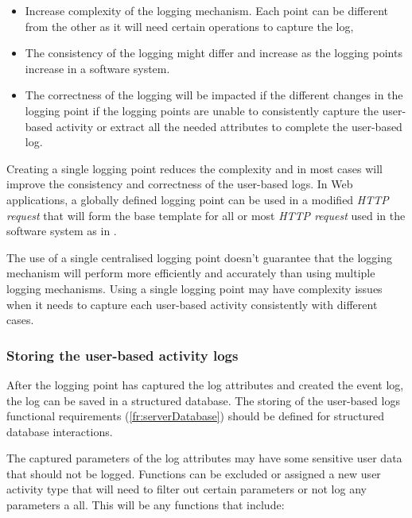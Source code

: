 \begin{itemize}
	\item Increase complexity of the logging mechanism. Each point can be different from the other as it will need certain operations to capture the log,
	\item The consistency of the logging might differ and increase as the logging points increase in a software system. 
	\item The correctness of the logging will be impacted if the different changes in the logging point if the logging points are unable to consistently capture the user-based activity or extract all the needed attributes to complete the user-based log.
\end{itemize}

Creating a single logging point reduces the complexity and in most cases will improve the consistency and correctness of the user-based logs. In Web applications, a globally defined logging point can be used in a modified \textit{HTTP request} that will form the base template for all or most \textit{HTTP request} used in the software system as in .\par The use of a single centralised logging point doesn't guarantee that the logging mechanism will perform more efficiently and accurately than using multiple logging mechanisms. Using a single logging point may have complexity issues when it needs to capture each user-based activity consistently with different cases.

\subsubsection{Storing the user-based activity logs}\label{sec:ch2_databaseStorage}
After the logging point has captured the log attributes and created the event log, the log can be saved in a structured database. The storing of the user-based logs functional requirements (\ref{fr:serverDatabase}) should be defined for structured database interactions.\par The captured parameters of the log attributes may have some sensitive user data that should not be logged. Functions can be excluded or assigned a new user activity type that will need to filter out certain parameters or not log any parameters a all. This will be any functions that include:

